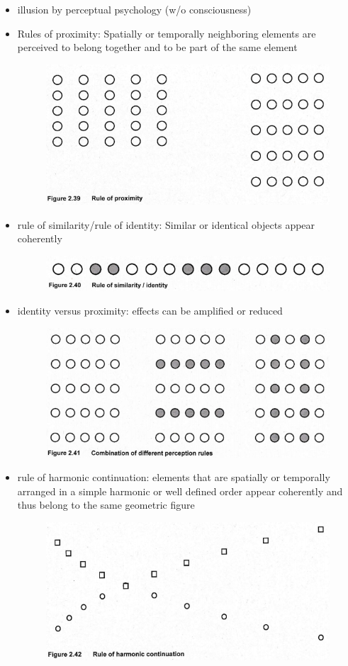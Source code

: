 \documentclass{standalone}
\begin{document}
\begin{itemize}
	\item illusion by perceptual psychology (w/o consciousness)
	\item Rules of proximity: Spatially or temporally neighboring elements are perceived to belong together and to be part of the same element
	\begin{figure}[H]
		\centering
		\includegraphics[width = 0.5\linewidth]{Figures/2_39.png}
	\end{figure}
	\item rule of similarity/rule of identity: Similar or identical objects appear coherently 
	\begin{figure}[H]
		\centering
		\includegraphics[width = 0.5\linewidth]{Figures/2_40.png}
	\end{figure}
	\item identity versus proximity: effects can be amplified or reduced
	\begin{figure}[H]
		\centering
		\includegraphics[width = 0.5\linewidth]{Figures/2_41.png}
	\end{figure}
	\item rule of harmonic continuation: elements that are spatially or temporally arranged in a simple harmonic or well defined order appear coherently and thus belong to the same geometric figure
	\begin{figure}[H]
		\centering
		\includegraphics[width = 0.5\linewidth]{Figures/2_42.png}

\end{figure}
\end{itemize}
\end{document}
